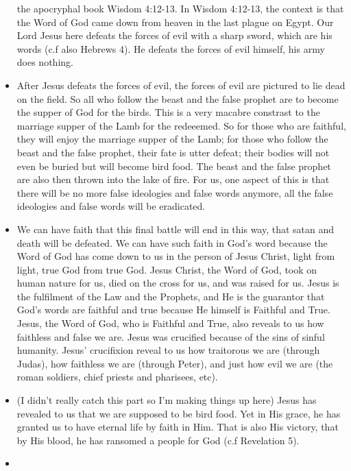 \begin{itemize}
{  the apocryphal book Wisdom 4:12-13.  In Wisdom 4:12-13, the context is that
  the Word of God came down from heaven in the last plague on Egypt.  Our
  Lord Jesus here defeats the forces of evil with a sharp sword, which are
  his words (c.f also Hebrews 4).  He defeats the forces of evil himself, his
  army does nothing.  }
  \item{After Jesus defeats the forces of evil, the forces of evil are
  pictured to lie dead on the field.  So all who follow the beast and the
  false prophet are to become the supper of God for the birds.  This is a
  very macabre constrast to the marriage supper of the Lamb for the
  redeeemed.  So for those who are faithful, they will enjoy the marriage
  supper of the Lamb; for those who follow the beast and the false prophet,
  their fate is utter defeat; their bodies will not even be buried but will
  become bird food.  The beast and the false prophet are also then thrown
  into the lake of fire.  For us, one aspect of this is that there will be no
  more false ideologies and false words anymore, all the false ideologies and
  false words will be eradicated.}
  \item{We can have faith that this final battle will end in this way, that
  satan and death will be defeated.  We can have such faith in God's word
  because the Word of God has come down to us in the person of Jesus Christ,
  light from light, true God from true God.  Jesus Christ, the Word of God,
  took on human nature for us, died on the cross for us, and was raised for
  us.  Jesus is the fulfilment of the Law and the Prophets, and He is the
  guarantor that God's words are faithful and true because He himself is
  Faithful and True.  Jesus, the Word of God, who is Faithful and True, also
  reveals to us how faithless and false we are.  Jesus was crucified because
  of the sins of sinful humanity.  Jesus' crucifixion reveal to us how
  traitorous we are (through Judas), how faithless we are (through Peter),
  and just how evil we are (the roman soldiers, chief priests and pharisees,
  etc). }
  \item{(I didn't really catch this part so I'm making things up here) Jesus
  has revealed to us that we are supposed to be bird food.  Yet in His grace,
  he has granted us to have eternal life by faith in Him.  That is also His
  victory, that by His blood, he has ransomed a people for God (c.f
  Revelation 5).  }
  \item{\begin{figure}[H]
    \centering

\end{figure}}
\end{itemize}
